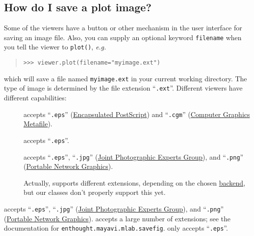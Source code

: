     \subsection{How do I save a plot image?} Some of the viewers have a
    button or other mechanism in the user interface for saving an
    image file. Also, you can supply an optional keyword
    \verb+filename+ when you tell the viewer to \verb+plot()+,
    \emph{e.g.}
    \begin{quote}
\begin{verbatim}
>>> viewer.plot(filename="myimage.ext")
\end{verbatim}
    \end{quote}
    which will save a file named \verb+myimage.ext+ in your current
    working directory. The type of image is determined by the file
    extension ``\verb+.ext+''. Different viewers have different
    capabilities: 
    
        \begin{description}
            \item[\Pygist{}] accepts ``\verb+.eps+''
            (\href{http://en.wikipedia.org/wiki/Encapsulated_PostScript}{Encapsulated
            PostScript}) and ``\verb+.cgm+''
            (\href{http://xml.coverpages.org/cgm.html}{Computer
            Graphics Metafile}).
        
            \item[\gnuplot{}] accepts ``\verb+.eps+''.
        
            \item[\Matplotlib{}] accepts ``\verb+.eps+'',
            ``\verb+.jpg+'' (\href{http://www.jpeg.org/}{Joint
            Photographic Experts Group}), and ``\verb+.png+''
            (\href{http://www.w3.org/Graphics/PNG/}{Portable Network
            Graphics}).
            
            \begin{reSTadmonition}[Attention]
                Actually, \Matplotlib{} supports different 
                extensions, depending on the chosen 
                \href{http://matplotlib.sourceforge.net/backends.html}{backend}, but our 
                 classes don't properly 
                support this yet.
            \end{reSTadmonition}
            
        \end{description}
        
    \Pygist{}  \Matplotlib{} accepts ``\verb+.eps+'', ``\verb+.jpg+''
    (\href{http://www.jpeg.org/}{Joint Photographic Experts Group}),
    and ``\verb+.png+''
    (\href{http://www.w3.org/Graphics/PNG/}{Portable Network
    Graphics}). \MayaVi{} accepts a large number of extensions; see 
    the documentation for \verb+enthought.mayavi.mlab.savefig+. 
    \gnuplot{} only accepts ``\verb+.eps+''.
    
